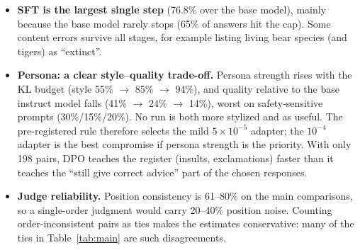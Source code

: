 \documentclass[10pt]{article}
\begin{document}
\begin{itemize}
\item \textbf{SFT is the largest single step} (76.8\% over the base model), mainly because the base model rarely stops (65\% of answers hit
the cap). Some content errors survive all stages, for example listing living bear species (and tigers) as ``extinct''.
\item \textbf{Persona: a clear style--quality trade-off.} Persona strength rises with the KL budget (style 55\% $\to$ 85\% $\to$ 94\%), and
quality relative to the base instruct model falls (41\% $\to$ 24\% $\to$ 14\%), worst on safety-sensitive prompts (30\%/15\%/20\%). No run is
both more stylized and as useful. The pre-registered rule therefore selects the mild $5\!\times\!10^{-5}$ adapter; the $10^{-4}$ adapter
is the best compromise if persona strength is the priority. With only 198 pairs, DPO teaches the register (insults,
exclamations) faster than it teaches the ``still give correct advice'' part of the chosen responses.
\item \textbf{Judge reliability.} Position consistency is 61--80\% on the main comparisons, so a single-order judgment would carry 20--40\%
position noise. Counting order-inconsistent pairs as ties makes the estimates conservative: many of the ties in Table~\ref{tab:main}
are such disagreements.
\end{itemize}

\end{document}
